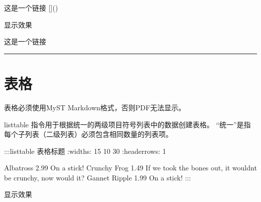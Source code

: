 \documentclass[letterpaper,10pt,english]{sphinxmanual}
\begin{document}
\begin{sphinxVerbatim}[commandchars=\\\{\}]
这是一个链接 []()
\end{sphinxVerbatim}

\sphinxAtStartPar
显示效果

\sphinxAtStartPar
这是一个链接 


\bigskip\hrule\bigskip



\section{表格}
\label{\detokenize{other/myst_markdown:id20}}
\sphinxAtStartPar
表格必须使用MyST Markdown格式，否则PDF无法显示。

\sphinxAtStartPar
list\sphinxhyphen{}table 指令用于根据统一的两级项目符号列表中的数据创建表格。 “统一”是指每个子列表（二级列表）必须包含相同数量的列表项。

\begin{sphinxVerbatim}[commandchars=\\\{\}]
:::\PYGZob{}list\PYGZhy{}table\PYGZcb{} 表格标题
:widths: 15 10 30
:header\PYGZhy{}rows: 1

  \PYGZhy{} 
  \PYGZhy{} Albatross
2.99
On a stick!
  \PYGZhy{} Crunchy Frog
1.49
If we took the bones out, it wouldn\PYGZsq{}t be
 crunchy, now would it?
  \PYGZhy{} Gannet Ripple
1.99
On a stick!
:::
\end{sphinxVerbatim}

\sphinxAtStartPar
显示效果
\end{document}
